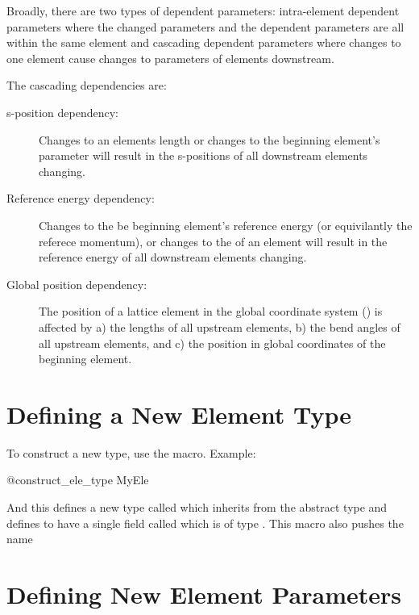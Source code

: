 Broadly, there are two types of dependent parameters: intra-element dependent parameters where
the changed parameters and the dependent parameters are all within the same element and
cascading dependent parameters where changes to one element cause changes to parameters of 
elements downstream.

The cascading dependencies are:
\begin{description}
%
\item [s-position dependency:]
Changes to an elements length  or changes to the beginning element's  parameter will
result in the s-positions of all downstream elements changing.
%
\item [Reference energy dependency:] Changes to the be beginning element's reference energy (or
equivilantly the referece momentum), or changes to the  of an  element
will result in the reference energy of all downstream elements changing.
%
\item[Global position dependency:]
The position of a lattice element in the global coordinate system () is affected
by a) the lengths of all upstream elements, b) the bend angles of all upstream elements, and c)
the position in global coordinates of the beginning element.
\end{description}


\section{Defining a New Element Type}
\label{s:ele.new.type}

To construct a new type, use the  macro. Example:
\begin{example}
  @construct_ele_type MyEle
\end{example}
And this defines a new type called  which inherits from the abstract type  and
defines  to have a single field called  which is of type .
This macro also pushes the name

\section{Defining New Element Parameters}
\label{s:ele.new.param}

